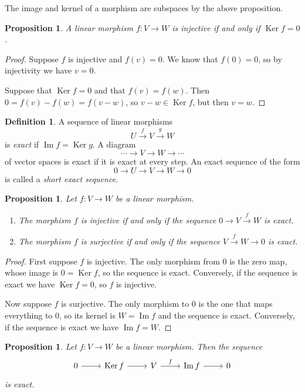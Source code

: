 \documentclass[11pt]{article}
\newtheorem{prop}[theo]{Proposition}
\theoremstyle{definition}
\newtheorem{defi}[theo]{Definition}
\DeclareMathOperator{\Ker}{Ker}
\DeclareMathOperator{\Img}{Im}
\begin{document}
The image and kernel of a morphism are subspaces by the above proposition.

\begin{prop}
A linear morphism $f : V \to W$ is injective if and only if $\Ker f = 0$.
\end{prop}

\begin{proof}
Suppose $f$ is injective and $f(v) = 0$.
We know that $f(0) = 0$, so by injectivity we have $v = 0$.

Suppose that $\Ker f = 0$ and that $f(v) = f(w)$.
Then $0 = f(v) - f(w) = f(v-w)$, so $v-w \in \Ker f$, but then $v = w$.
\end{proof}


\begin{defi}
A sequence of linear morphisms
\[
U \stackrel{f}{\longrightarrow} V \stackrel{g}{\longrightarrow} W
\]
is \emph{exact} if $\Img f = \Ker g$.
A diagram
\[
\cdots \longrightarrow V \longrightarrow W \longrightarrow \cdots
\]
of vector spaces is exact if it is exact at every step.
An exact sequence of the form
\[
0 \longrightarrow U \longrightarrow V \longrightarrow W \longrightarrow 0
\]
is called a \emph{short exact sequence}.
\end{defi}


\begin{prop}
Let $f : V \to W$ be a linear morphism.
\begin{enumerate}
\item
The morphism $f$ is injective if and only if the sequence $0 \to V \stackrel{f}{\to} W$ is exact.

\item
The morphism $f$ is surjective if and only if the sequence $V \stackrel{f}{\to} W \to 0$ is exact.
\end{enumerate}
\end{prop}

\begin{proof}
First suppose $f$ is injective.
The only morphism from $0$ is the zero map, whose image is $0 = \Ker f$, so the sequence is exact.
Conversely, if the sequence is exact we have $\Ker f = 0$, so $f$ is injective.

Now suppose $f$ is surjective.
The only morphism to $0$ is the one that maps everything to $0$, so its kernel is $W = \Img f$ and the sequence is exact.
Conversely, if the sequence is exact we have $\Img f = W$.
\end{proof}


\begin{prop}
Let $f : V \to W$ be a linear morphism.
Then the sequence
\[
\begin{tikzcd}
0 \ar[r] & \Ker f \ar[r] & V \ar[r,"f"] & \Img f \ar[r] & 0
\end{tikzcd}
\]
is exact.
\end{prop}
\end{document}
